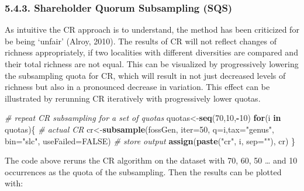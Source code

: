 \documentclass[]{article}
\newenvironment{Shaded}{\begin{snugshade}}{\end{snugshade}}
\newcommand{\CommentTok}[1]{\textcolor[rgb]{0.56,0.35,0.01}{\textit{#1}}}
\newcommand{\ControlFlowTok}[1]{\textcolor[rgb]{0.13,0.29,0.53}{\textbf{#1}}}
\newcommand{\DataTypeTok}[1]{\textcolor[rgb]{0.13,0.29,0.53}{#1}}
\newcommand{\DecValTok}[1]{\textcolor[rgb]{0.00,0.00,0.81}{#1}}
\newcommand{\KeywordTok}[1]{\textcolor[rgb]{0.13,0.29,0.53}{\textbf{#1}}}
\newcommand{\NormalTok}[1]{#1}
\newcommand{\OperatorTok}[1]{\textcolor[rgb]{0.81,0.36,0.00}{\textbf{#1}}}
\newcommand{\OtherTok}[1]{\textcolor[rgb]{0.56,0.35,0.01}{#1}}
\newcommand{\StringTok}[1]{\textcolor[rgb]{0.31,0.60,0.02}{#1}}
\begin{document}
\hypertarget{shareholder-quorum-subsampling-sqs}{%
\subsubsection{5.4.3. Shareholder Quorum Subsampling
(SQS)}\label{shareholder-quorum-subsampling-sqs}}

As intuitive the CR approach is to understand, the method has been
criticized for be being `unfair' (Alroy, 2010). The results of CR will
not reflect changes of richness appropriately, if two localities with
different diversities are compared and their total richness are not
equal. This can be visualized by progressively lowering the subsampling
quota for CR, which will result in not just decreased levels of richness
but also in a pronounced decrease in variation. This effect can be
illustrated by rerunning CR iteratively with progressively lower quotas.

\begin{Shaded}
\begin{Highlighting}[]
\CommentTok{# repeat CR subsampling for a set of quotas}
\NormalTok{quotas<-}\KeywordTok{seq}\NormalTok{(}\DecValTok{70}\NormalTok{,}\DecValTok{10}\NormalTok{,}\OperatorTok{-}\DecValTok{10}\NormalTok{)}
\ControlFlowTok{for}\NormalTok{(i }\ControlFlowTok{in}\NormalTok{ quotas)\{}
   \CommentTok{# actual CR }
\NormalTok{   cr<-}\KeywordTok{subsample}\NormalTok{(fossGen, }\DataTypeTok{iter=}\DecValTok{50}\NormalTok{, }\DataTypeTok{q=}\NormalTok{i,}\DataTypeTok{tax=}\StringTok{"genus"}\NormalTok{, }\DataTypeTok{bin=}\StringTok{"slc"}\NormalTok{, }
    \DataTypeTok{useFailed=}\OtherTok{FALSE}\NormalTok{)}
  \CommentTok{# store output}
  \KeywordTok{assign}\NormalTok{(}\KeywordTok{paste}\NormalTok{(}\StringTok{"cr"}\NormalTok{, i, }\DataTypeTok{sep=}\StringTok{""}\NormalTok{), cr)}
\NormalTok{\}}
\end{Highlighting}
\end{Shaded}

The code above reruns the CR algorithm on the dataset with 70, 60, 50
\ldots{} and 10 occurrences as the quota of the subsampling. Then the
results can be plotted with:
\end{document}
